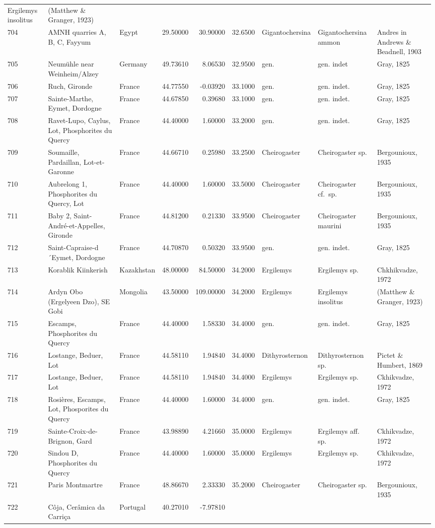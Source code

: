 \documentclass[]{article}
\begin{document}
\begin{longtable}[]{@{}lllrrrlll@{}}
Ergilemys insolitus & (Matthew \& Granger, 1923)\tabularnewline
704 & AMNH quarries A, B, C, Fayyum & Egypt & 29.50000 & 30.90000 &
32.6500 & Gigantochersina & Gigantochersina ammon & Andres in Andrews \&
Beadnell, 1903\tabularnewline
705 & Neumühle near Weinheim/Alzey & Germany & 49.73610 & 8.06530 &
32.9500 & gen. & gen. indet & Gray, 1825\tabularnewline
706 & Ruch, Gironde & France & 44.77550 & -0.03920 & 33.1000 & gen. &
gen. indet. & Gray, 1825\tabularnewline
707 & Sainte-Marthe, Eymet, Dordogne & France & 44.67850 & 0.39680 &
33.1000 & gen. & gen. indet. & Gray, 1825\tabularnewline
708 & Ravet-Lupo, Caylus, Lot, Phosphorites du Quercy & France &
44.40000 & 1.60000 & 33.2000 & gen. & gen. indet. & Gray,
1825\tabularnewline
709 & Soumaille, Pardaillan, Lot-et-Garonne & France & 44.66710 &
0.25980 & 33.2500 & Cheirogaster & Cheirogaster sp. & Bergounioux,
1935\tabularnewline
710 & Aubrelong 1, Phosphorites du Quercy, Lot & France & 44.40000 &
1.60000 & 33.5000 & Cheirogaster & Cheirogaster cf.~sp. & Bergounioux,
1935\tabularnewline
711 & Baby 2, Saint-André-et-Appelles, Gironde & France & 44.81200 &
0.21330 & 33.9500 & Cheirogaster & Cheirogaster maurini & Bergounioux,
1935\tabularnewline
712 & Saint-Capraise-d´Eymet, Dordogne & France & 44.70870 & 0.50320 &
33.9500 & gen. & gen. indet. & Gray, 1825\tabularnewline
713 & Korablik Kiinkerish & Kazakhstan & 48.00000 & 84.50000 & 34.2000 &
Ergilemys & Ergilemys sp. & Chkhikvadze, 1972\tabularnewline
714 & Ardyn Obo (Ergelyeen Dzo), SE Gobi & Mongolia & 43.50000 &
109.00000 & 34.2000 & Ergilemys & Ergilemys insolitus & (Matthew \&
Granger, 1923)\tabularnewline
715 & Escamps, Phosphorites du Quercy & France & 44.40000 & 1.58330 &
34.4000 & gen. & gen. indet. & Gray, 1825\tabularnewline
716 & Lostange, Beduer, Lot & France & 44.58110 & 1.94840 & 34.4000 &
Dithyrosternon & Dithyrosternon sp. & Pictet \& Humbert,
1869\tabularnewline
717 & Lostange, Beduer, Lot & France & 44.58110 & 1.94840 & 34.4000 &
Ergilemys & Ergilemys sp. & Ckhikvadze, 1972\tabularnewline
718 & Rosières, Escamps, Lot, Phosporites du Quercy & France & 44.40000
& 1.60000 & 34.4000 & gen. & gen. indet. & Gray, 1825\tabularnewline
719 & Sainte-Croix-de-Brignon, Gard & France & 43.98890 & 4.21660 &
35.0000 & Ergilemys & Ergilemys aff. sp. & Ckhikvadze,
1972\tabularnewline
720 & Sindou D, Phosphorites du Quercy & France & 44.40000 & 1.60000 &
35.0000 & Ergilemys & Ergilemys sp. & Ckhikvadze, 1972\tabularnewline
721 & Paris Montmartre & France & 48.86670 & 2.33330 & 35.2000 &
Cheirogaster & Cheirogaster sp. & Bergounioux, 1935\tabularnewline
722 & Côja, Cerâmica da Carriça & Portugal & 40.27010 & -7.97810 &

\end{longtable}
\end{document}
